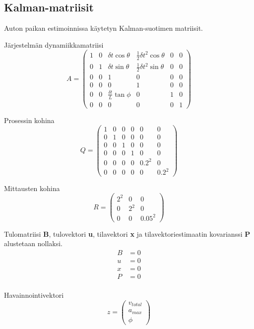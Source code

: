 \documentclass{article}
\begin{document}
\begin{appendices}
\section{Kalman-matriisit} \label{app:kalman}

Auton paikan estimoinnissa käytetyn Kalman-suotimen matriisit.

Järjestelmän dynamiikkamatriisi
\[
A =
\begin{pmatrix}
1 & 0 & \delta{t}\cos{\theta} & \frac{1}{2}\delta{t}^{2} \cos{\theta} & 0 & 0 \\
0 & 1 & \delta{t}\sin{\theta} & \frac{1}{2}\delta{t}^{2} \sin{\theta} & 0 & 0 \\
0 & 0 & 1 & 0 & 0 & 0 \\
0 & 0 & 0 & 1 & 0 & 0 \\
0 & 0 & \frac{\delta{t}}{L} \tan{\phi} & 0 & 1 & 0 \\
0 & 0 & 0 & 0 & 0 & 1
\end{pmatrix}
\]

Prosessin kohina
\[
Q =
\begin{pmatrix}
1 & 0 & 0 & 0 & 0 & 0 \\
0 & 1 & 0 & 0 & 0 & 0 \\
0 & 0 & 1 & 0 & 0 & 0 \\
0 & 0 & 0 & 1 & 0 & 0 \\
0 & 0 & 0 & 0 & 0.2^2 & 0 \\
0 & 0 & 0 & 0 & 0 & 0.2^2
\end{pmatrix}
\]

Mittausten kohina
\[
R =
\begin{pmatrix}
2^2 & 0 & 0 \\
0 & 2^2 & 0 \\
0 & 0 & 0.05^2
\end{pmatrix}
\]

Tulomatriisi \textbf{B}, tulovektori \textbf{u}, tilavektori \textbf{x} ja tilavektoriestimaatin kovarianssi \textbf{P} alustetaan nollaksi.
\begin{align*}
B &= 0\\
u &= 0\\
x &= 0\\
P &= 0\\
\end{align*}

Havainnointivektori
\[
z =
\begin{pmatrix}
v_{total} \\
a_{max} \\
\phi
\end{pmatrix}
\]


\end{appendices}
\end{document}

